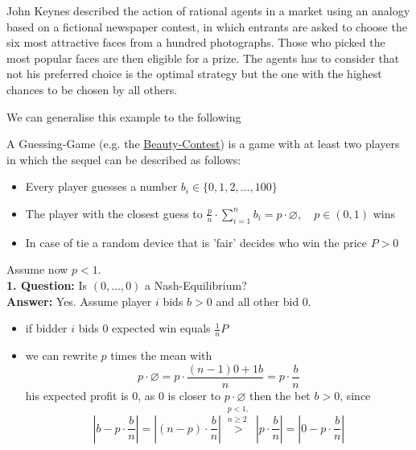 \begin{example}  \label{Beauty-Contest}
John Keynes described the action of rational agents in a market using an analogy based on a fictional newspaper contest, in which entrants are asked to choose the six most attractive faces from a hundred photographs. Those who picked the most popular faces are then eligible for a prize. The agents has to consider that not his preferred choice is the optimal strategy but the one with the highest chances to be chosen by all others.
\end{example}
We can generalise this example to the following \\
\begin{example}  \label{Guessing-Game}
	 A Guessing-Game (e.g. the \hyperref[Beauty-Contest]{Beauty-Contest}) is a game with at least two players in which the sequel can be described as follows:
	\begin{itemize}
		\item Every player guesses a number $b_{i} \in \{0, 1, 2, \dotsc, 100 \}$
		\item The player with the closest guess to $\frac{p}{n} \cdot \sum_{i = 1}^{n} b_{i} = p \cdot \varnothing, \quad p \in (0, 1)$ wins
		\item In case of tie a random device that is 'fair' decides who win the price $P > 0$
	\end{itemize}
	Assume now $p < 1$. \\
	\textbf{1. Question:} Is $(0, \dotsc, 0)$ a Nash-Equilibrium? \\
	\textbf{Answer:} Yes. Assume player $i$ bids $b > 0$ and all other bid $0$.	
		\begin{itemize}
			\item if bidder $i$ bids $0$ expected win equals $\frac{1}{n} P $
			\item we can rewrite $p$ times the mean with	
				\[ p \cdot \varnothing = p \cdot \frac{(n - 1)0 + 1 b}{n} = p \cdot \frac{b}{n} \]
			his expected profit is $0$, as $0$ is closer to $p \cdot \varnothing$ then the bet $b > 0$, since
			\[ \left| b - p \cdot \frac{b}{n} \right| =  \left|(n-p) \cdot \frac{b}{n} \right| \overset{\substack{p < 1, \\ n \geq 2}}{>} \left| p \cdot \frac{b}{n} \right| = \left| 0 - p \cdot \frac{b}{n} \right| \]
		\end{itemize}
	

\end{example}
